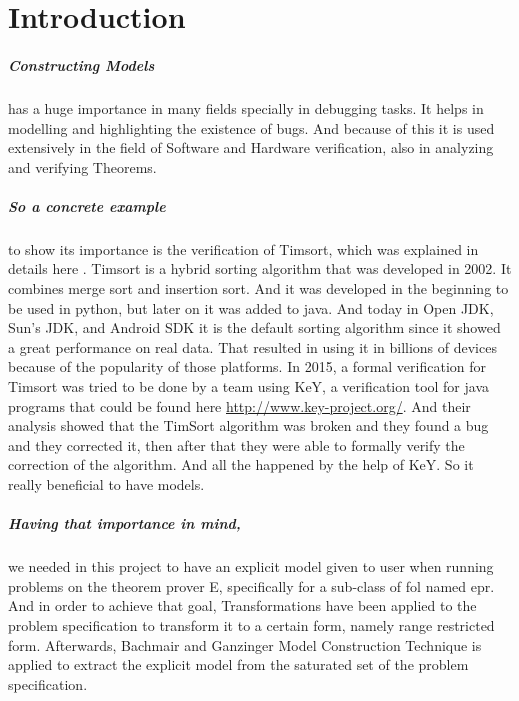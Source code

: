 \chapter{Introduction}\label{chap:intro}

	\paragraph{    Constructing Models} has a huge importance in many fields specially in debugging tasks. It helps in modelling and highlighting the existence of bugs. And because of this it is used extensively in the field of Software and Hardware verification, also in analyzing and verifying Theorems.

	\paragraph{    So a concrete example} to show its importance is the verification of Timsort, which was explained in details here \cite{TIMSORT}. Timsort is a hybrid sorting algorithm that was developed in 2002. It combines merge sort and insertion sort. And it was developed in the beginning to be used in python, but later on it was added to java. And today in Open JDK, Sun's JDK, and Android SDK it is the default sorting algorithm since it showed a great performance on real data. That resulted in using it in billions of devices because of the popularity of those platforms. In 2015, a formal verification for Timsort was tried to be done by a team using KeY, a verification tool for java programs that could be found here \url{http://www.key-project.org/}. And their analysis showed that the TimSort algorithm was broken and they found a bug and they corrected it, then after that they were able to formally verify the correction of the algorithm. And all the happened by the help of KeY. So it really beneficial to have models.

	\paragraph{    Having that importance in mind,} we needed in this project to have an explicit model given to user when running problems on the theorem prover E, specifically for a sub-class of \ac{fol} named \ac{epr}. And in order to achieve that goal, Transformations have been applied to the problem specification to transform it to a certain form, namely range restricted form. Afterwards, Bachmair and Ganzinger Model Construction Technique is applied to extract the explicit model from the saturated set of the problem specification. 


